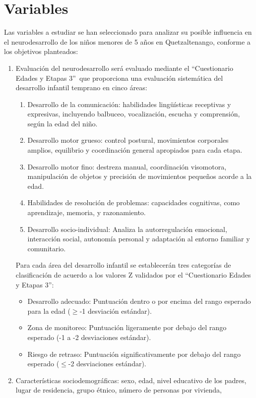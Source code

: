 \documentclass[11pt,letterpaper]{report}
\newcommand{\asq}{“Cuestionario Edades y Etapas 3”}
\begin{document}
\section{Variables}
Las variables a estudiar se han seleccionado para analizar su posible
influencia en el neurodesarrollo de los niños menores de 5 años en
Quetzaltenango, conforme a los objetivos planteados:
\begin{enumerate}
	\item Evaluación del neurodesarrollo será evaluado mediante el \asq\ que
	proporciona una evaluación sistemática del desarrollo infantil temprano en
	cinco áreas:
		\begin{enumerate}
			\item Desarrollo de la comunicación: habilidades lingüísticas
			receptivas y expresivas, incluyendo balbuceo, vocalización,
			escucha y comprensión, según la edad del niño.
			\item Desarrollo motor grueso: control postural, movimientos
			corporales amplios, equilibrio y coordinación general apropiados
			para cada etapa.
			\item Desarrollo motor fino: destreza manual, coordinación
			visomotora, manipulación de objetos y precisión de movimientos
			pequeños acorde a la edad.
			\item Habilidades de resolución de problemas: capacidades
			cognitivas, como aprendizaje, memoria, y razonamiento.
			\item Desarrollo socio-individual: Analiza la autorregulación
			emocional, interacción social, autonomía personal y adaptación al
			entorno familiar y comunitario.
		\end{enumerate}
Para cada área del desarrollo infantil se establecerán tres categorías de
clasificación de acuerdo a los valores Z validados por el \asq:
		\begin{itemize}
			\item Desarrollo adecuado: Puntuación dentro o por encima del rango
			esperado para la edad ($\geq$-1 desviación estándar).
			\item Zona de monitoreo: Puntuación ligeramente por debajo del rango
			esperado (-1 a -2 desviaciones estándar).
			\item Riesgo de retraso: Puntuación significativamente por debajo
			del rango esperado ($\leq$-2 desviaciones estándar).
		\end{itemize}
	\item Características sociodemográficas: sexo, edad, nivel educativo de los
padres, lugar de residencia, grupo étnico, número de personas por vivienda,

\end{enumerate}
\end{document}
